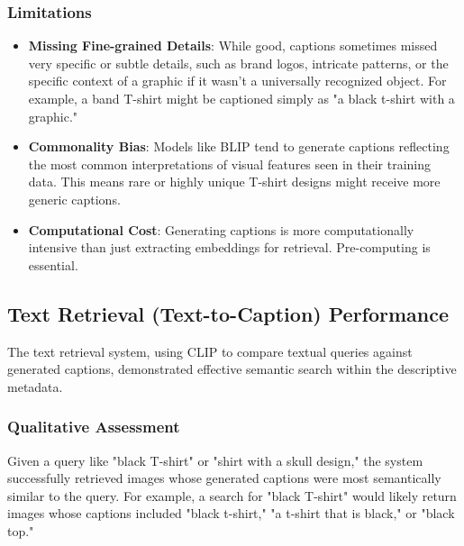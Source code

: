\documentclass{article}
\begin{document}
\subsubsection{Limitations}
\begin{itemize}
    \item \textbf{Missing Fine-grained Details}: While good, captions sometimes missed very specific or subtle details, such as brand logos, intricate patterns, or the specific context of a graphic if it wasn't a universally recognized object. For example, a band T-shirt might be captioned simply as "a black t-shirt with a graphic."
    \item \textbf{Commonality Bias}: Models like BLIP tend to generate captions reflecting the most common interpretations of visual features seen in their training data. This means rare or highly unique T-shirt designs might receive more generic captions.
    \item \textbf{Computational Cost}: Generating captions is more computationally intensive than just extracting embeddings for retrieval. Pre-computing is essential.
\end{itemize}

\subsection{Text Retrieval (Text-to-Caption) Performance}
The text retrieval system, using CLIP to compare textual queries against generated captions, demonstrated effective semantic search within the descriptive metadata.

\subsubsection{Qualitative Assessment}
Given a query like "black T-shirt" or "shirt with a skull design," the system successfully retrieved images whose generated captions were most semantically similar to the query. For example, a search for "black T-shirt" would likely return images whose captions included "black t-shirt," "a t-shirt that is black," or "black top."
\end{document}
